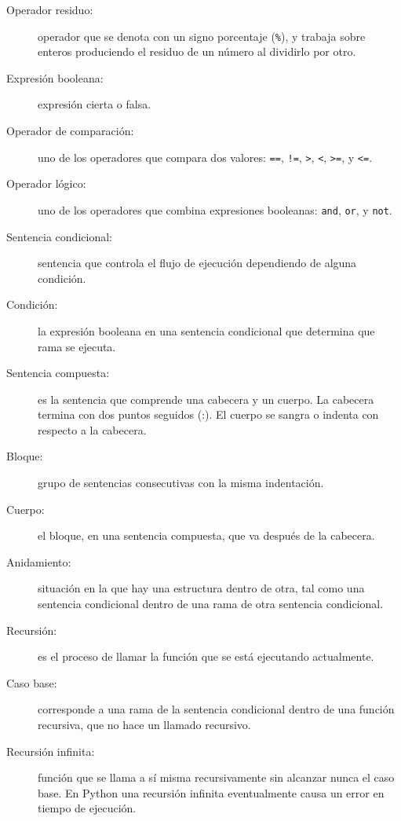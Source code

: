 \begin{description}
	\item[Operador residuo:]  operador que se denota con un  signo porcentaje
	(\texttt{\%}), y trabaja sobre enteros produciendo el residuo de un número 
	al 
	dividirlo por otro.
	
	\item[Expresión booleana:]  expresión cierta o falsa.
	
	\item[Operador de comparación:] uno de los operadores que compara dos 
	valores: 
	\texttt{==}, \texttt{!=}, \texttt{>}, \texttt{<}, \texttt{>=}, y 
	\texttt{<=}.
	
	\item[Operador lógico:] uno de los operadores que combina
	expresiones booleanas: \texttt{and}, \texttt{or}, y \texttt{not}.
	
	\item[Sentencia condicional:]  sentencia que controla el flujo
	de ejecución dependiendo de alguna  condición.
	
	\item[Condición:] la expresión booleana en una sentencia condicional 
	que determina que rama se ejecuta.
	
	\item[Sentencia compuesta:]  es la sentencia que comprende una
	cabecera y un cuerpo. La cabecera termina con dos puntos seguidos (:). 
	El cuerpo se sangra o indenta con respecto a la cabecera.
	
	\item[Bloque:] grupo de sentencias consecutivas con la misma
	indentación.
	
	\item[Cuerpo:] el bloque, en una sentencia compuesta, que va 
	después de la cabecera.
	
	\item[Anidamiento:]  situación en la que hay una estructura dentro de otra,
	tal como una sentencia  condicional dentro de una rama
	de otra sentencia condicional.
	
	\item[Recursión:]  es el proceso de llamar la función que se está
	ejecutando actualmente.
	
	\item[Caso base:]  corresponde a una rama de la sentencia  condicional 
	dentro 
	de una función recursiva, que no hace un llamado recursivo.
	
	\item[Recursión infinita:]  función que se llama a sí misma
	recursivamente sin alcanzar nunca el caso base. En Python una 
	recursión infinita eventualmente causa un error en tiempo de
	ejecución.
	

\end{description}
